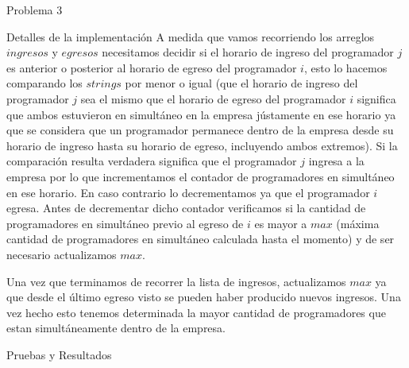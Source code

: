 \begin{section}{Problema 3}
\begin{subsection}{Detalles de la implementación}
	A medida que vamos recorriendo los arreglos $ingresos$ y $egresos$ necesitamos decidir si el horario de ingreso del programador $j$ es anterior o posterior al horario de egreso del programador $i$, esto lo hacemos comparando los $strings$ por menor o igual (que el horario de ingreso del programador $j$ sea el mismo que el horario de egreso del programador $i$ significa que ambos estuvieron en simultáneo en la empresa jústamente en ese horario ya que se considera que un programador permanece dentro de la empresa desde su horario de ingreso hasta su horario de egreso, incluyendo ambos extremos). Si la comparación resulta verdadera significa que el programador $j$ ingresa a la empresa por lo que incrementamos el contador de programadores en simultáneo en ese horario. En caso contrario lo decrementamos ya que el programador $i$ egresa. Antes de decrementar dicho contador verificamos si la cantidad de programadores en simultáneo previo al egreso de $i$ es mayor a $max$ (máxima cantidad de programadores en simultáneo calculada hasta el momento) y de ser necesario actualizamos $max$.

	Una vez que terminamos de recorrer la lista de ingresos, actualizamos $max$ ya que desde el último egreso visto se pueden haber producido nuevos ingresos. Una vez hecho esto tenemos determinada la mayor cantidad de programadores que estan simultáneamente dentro de la empresa.
	\end{subsection}

	\begin{subsection}{Pruebas y Resultados}			
	\end{subsection}

\end{section}







